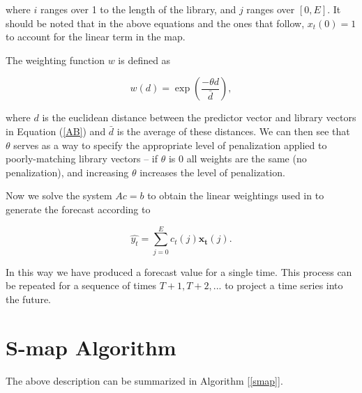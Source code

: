     where $i$ ranges over 1 to the length of the library, and $j$ ranges over $[0,E]$. It should be noted that in the above equations and the ones that follow, $x_t(0) = 1$ to account for the linear term in the map.

	The weighting function $w$ is defined as

	\begin{equation}
		w(d) = \exp \left( \frac{-\theta d}{\bar{d}} \right) ,
	\end{equation}

	where $d$ is the euclidean distance between the predictor vector and library vectors in Equation (\ref{AB}) and $\bar{d}$ is the average of these distances. We can then see that $\theta$ serves as a way to specify the appropriate level of penalization applied to poorly-matching library vectors -- if $\theta$ is 0 all weights are the same (no penalization), and increasing $\theta$ increases the level of penalization.

	Now we solve the system $Ac = b$ to obtain the linear weightings used in to generate the forecast according to

	\begin{equation}
		\hat{y_t} = \sum_{j = 0}^{E} c_t(j) \mathbf{x_t}(j) .
	\end{equation}

	In this way we have produced a forecast value for a single time. This process can be repeated for a sequence of times $T + 1, T + 2, ...$ to project a time series into the future.


\section{S-map Algorithm}

    The above description can be summarized in Algorithm [\ref{smap}].

